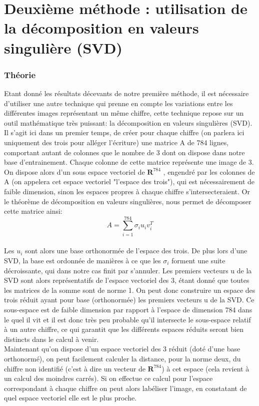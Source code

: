 \documentclass[a4paper,11pt,twoside]{report}
\begin{document}
\chapter{Deuxième méthode : utilisation de la décomposition en valeurs singulière (SVD)}
\subsection{Théorie}
Etant donné les résultats décevants de notre première méthode, il est nécessaire d'utiliser une autre technique qui prenne en compte les variations entre les différentes images représentant un même chiffre, cette technique repose sur un outil mathématique très puissant: la décomposition en valeurs singulières (SVD).\\
Il s'agit ici dans un premier temps, de créer pour chaque chiffre (on parlera ici uniquement des trois pour alléger l'écriture) une matrice A de 784 lignes, comportant autant de colonnes que le nombre de 3 dont on dispose dans notre base d'entrainement. Chaque colonne de cette matrice représente une image de 3. On dispose alors d'un sous espace vectoriel de $\textbf{R}^{784}$ , engendré par les colonnes de A (on appelera cet espace vectoriel "l'espace des trois"), qui est nécessairement de faible dimension, sinon les espaces propres à chaque chiffre s'intersecteraient. Or le théorème de décomposition en valeurs singulières, nous permet de décomposer cette matrice ainsi: $$A = \sum_{i=1}^{784}{\sigma_{i}u_{i}v_{i}^{T}}$$\\
Les $u_{i}$ sont alors une base orthonormée de l'espace des trois. De plus lors d'une SVD, la base est ordonnée de manières à ce que les $\sigma_{i}$ forment une suite décroissante, qui dans notre cas finit par s'annuler. Les premiers vecteurs u de la SVD sont alors représentatifs de l'espace vectoriel des 3, étant donné que toutes les matrices de la somme sont de norme 1. On peut donc construire un espace des trois réduit ayant pour base (orthonormée) les premiers vecteurs u de la SVD. Ce sous-espace est de faible dimension par rapport à l'espace de dimension 784 dans le quel il vit et il est donc très peu probable qu'il intersecte le sous-espace relatif à un autre chiffre, ce qui garantit que les différents espaces réduits seront bien distincts dans le calcul à venir.\\
Maintenant qu'on dispose d'un espace vectoriel des 3 réduit (doté d'une base orthonormé), on peut facilement calculer la distance, pour la norme deux, du chiffre non identifié (c'est à dire un vecteur de  $\textbf{R}^{784}$) à cet espace (cela revient à un calcul des moindres carrés). Si on effectue ce calcul pour l'espace correspondant à chaque chiffre on peut alors labéliser l'image, en constatant de quel espace vectoriel elle est le plus proche.
\end{document}
